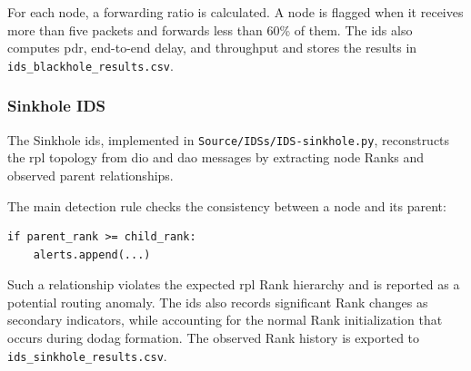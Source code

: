 For each node, a forwarding ratio is calculated.
A node is flagged when it receives more than five packets and forwards less than 60\% of them.
The \gls{ids} also computes \gls{pdr}, end-to-end delay, and throughput and stores the results in \texttt{ids\_blackhole\_results.csv}.

\subsubsection{Sinkhole IDS}
The Sinkhole \gls{ids}, implemented in \texttt{Source/IDSs/IDS-sinkhole.py}, reconstructs the \gls{rpl} topology from \gls{dio} and \gls{dao} messages by extracting node Ranks and observed parent relationships.

The main detection rule checks the consistency between a node and its parent:

\begin{verbatim}
if parent_rank >= child_rank:
    alerts.append(...)
\end{verbatim}

Such a relationship violates the expected \gls{rpl} Rank hierarchy and is reported as a potential routing anomaly.
The \gls{ids} also records significant Rank changes as secondary indicators, while accounting for the normal Rank initialization that occurs during \gls{dodag} formation.
The observed Rank history is exported to \texttt{ids\_sinkhole\_results.csv}.